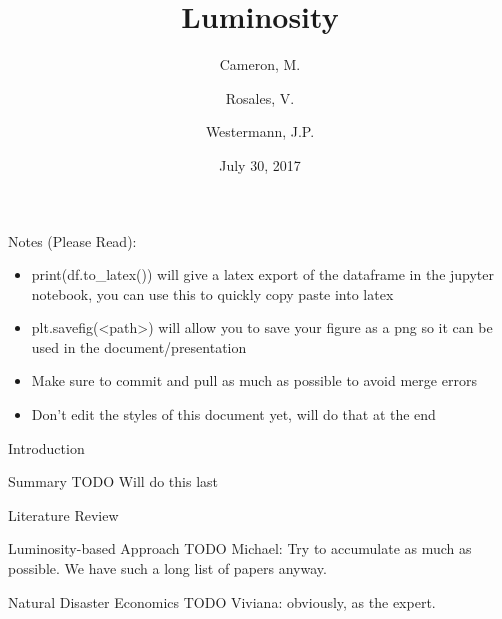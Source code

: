 \documentclass[12pt,fleqn,leqno,letterpaper]{article}
\title{Luminosity}
\author{Cameron, M. \and Rosales, V. \and Westermann, J.P.}
\date{July 30, 2017}
\begin{document}
\maketitle
\newpage
\tableofcontents
\listoffigures
\listoftables

\newpage

Notes (Please Read):
\begin{itemize}
  \item print(df.to\_latex()) will give a latex export of the dataframe in the jupyter notebook, you can use this to quickly copy paste into latex
  \item plt.savefig(<path>) will allow you to save your figure as a png so it can be used in the document/presentation
  \item Make sure to commit and pull as much as possible to avoid merge errors
  \item Don't edit the styles of this document yet, will do that at the end
\end{itemize}

\begin{section}{Introduction}
  \begin{subsection}{Summary}
    TODO Will do this last
  \end{subsection}
  \begin{subsection}{Literature Review}
    \begin{subsubsection}{Luminosity-based Approach}
      TODO Michael: Try to accumulate as much as possible. We have such a long list of papers anyway.
    \end{subsubsection}
    \begin{subsubsection}{Natural Disaster Economics}
      TODO Viviana: obviously, as the expert.
    \end{subsubsection}
  \end{subsection}
\end{section}
\end{document}
